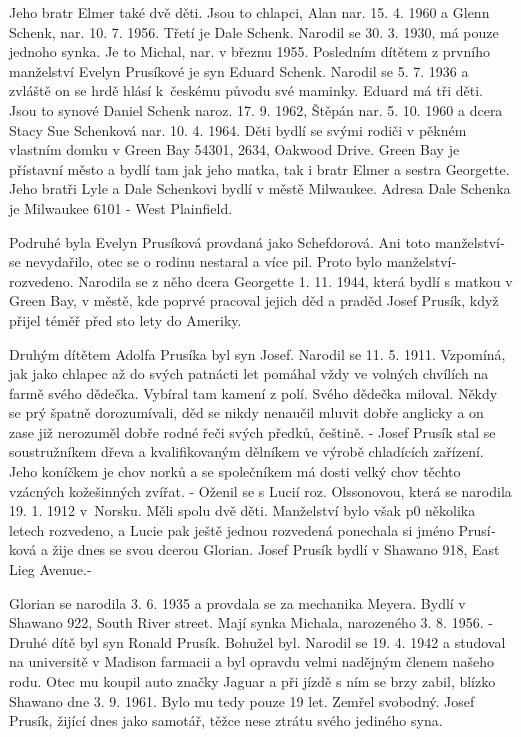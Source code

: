 \documentclass[../dejiny-rodu-prusiku.tex]{subfiles}
\begin{document}
Jeho bratr Elmer také dvě děti. Jsou to chlapci, Alan nar. 15. 4. 1960 a Glenn Schenk, nar. 10. 7. 1956. Třetí­ je Dale Schenk. Narodil se 30. 3. 1930, má pouze jednoho synka. Je to Michal, nar. v březnu 1955. Poslední­m dítětem z prvního manželství­ Evelyn Prusí­kové je syn Eduard Schenk. Narodil se 5. 7. 1936 a zvláště on se hrdě hlásí k českému původu své maminky. Eduard má tři děti. Jsou to synové Daniel Schenk naroz. 17. 9. 1962, Štěpán nar. 5. 10. 1960 a dcera Stacy Sue Schenková nar. 10. 4. 1964. Děti bydlí­ se svými rodiči v pěkném vlastní­m domku v Green Bay 54301, 2634, Oakwood Drive. Green Bay je přístavní město­ a bydlí­ tam jak jeho matka, tak i bratr Elmer a sestra Georgette. Jeho bratři Lyle a Dale Schenkovi bydlí­ v městě Milwaukee. Adresa Dale Schenka je Milwaukee 6101 - West Plainfield.

Podruhé byla Evelyn Prusí­ková provdaná jako Schefdorová. Ani toto manželství­ se nevydařilo, otec se o rodinu nestaral a ví­ce pil. Proto bylo manželství­ rozvedeno. Narodila se z něho dcera Georgette 1. 11. 1944, která bydlí­ s matkou v Green Bay, v mě­stě, kde poprvé pracoval jejich děd a praděd Josef Prusí­k, když přijel téměř před sto lety do Ameriky.

Druhým dí­tětem Adolfa Prusí­ka byl syn Josef. Narodil se 11. 5. 1911. Vzpomí­ná, jak jako chlapec až do svých patnácti let pomáhal vždy ve volných chví­lí­ch na farmě svého dědečka. Vybí­ral tam kamení­ z polí. Svého dědečka miloval. Někdy se prý špatně dorozumí­vali, děd se nikdy nenaučil mluvit dobře anglicky a on zase již nerozuměl dobře rodné řeči svých předků, češtině. - Josef Prusík stal se soustružní­kem dřeva a kvalifikovaným dělní­kem ve výrobě chladí­cí­ch zaří­zení. Jeho koníčkem je chov norků a se společní­kem má dosti velký chov těchto vzácných kožešinných zvířat. - Oženil se s Lucií­ roz. Olssonovou, která se narodila 19. 1. 1912 v Norsku. Měli spolu dvě děti. Manželství­ bylo však p0 několika letech rozvedeno, a Lucie pak ještě jednou rozvedená ponechala si jméno Prusí­ková a žije dnes se svou dcerou Glorian. Josef Prusík bydlí­ v Shawano 918, East Lieg Avenue.-

Glorian se narodila 3. 6. 1935 a provdala se za mechanika M­eyera. Bydlí­ v Shawano 922, South River street. Mají synka Michala, narozeného 3. 8. 1956. - Druhé dítě byl syn Ronald Prusík. Bohužel byl. Narodil se 19. 4. 1942 a studoval na universitě v Madison farmacii a byl opravdu velmi nadějným členem našeho rodu. Otec mu koupil auto značky Jaguar a při jí­zdě s ní­m se brzy zabil, blí­zko Shawano dne 3. 9. 1961. Bylo mu tedy pouze 19 let. Zemřel svobodný. Josef Prusík, žijící­ dnes jako samotář, těžce nese ztrátu svého jediného syna.
\end{document}
